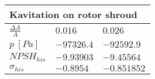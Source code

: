 \vspace{20pt}\newline
\begin{tabular}{|l|l|l|}
\multicolumn{3}{l}{Kavitation on rotor shroud} \\ 
\hline
$\frac{\Delta A}{A}$ & $0.016$& $0.026$  \\ 
\hline
$p \ [Pa]$ & $-97326.4$& $-92592.9$  \\ 
\hline
$NPSH_{his}$ & $-9.93903$& $-9.45564$  \\ 
\hline
$\sigma_{his}$ & $-0.8954$& $-0.851852$  \\ 
\hline
\end{tabular}
